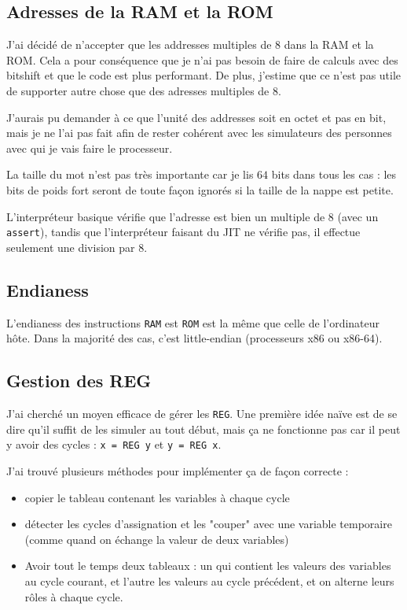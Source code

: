 \documentclass[12pt]{article}
\begin{document}
\subsection{Adresses de la RAM et la ROM}

J'ai décidé de n'accepter que les addresses multiples de $8$ dans la RAM et la ROM. Cela a pour conséquence que je n'ai pas besoin de faire de calculs avec des bitshift et que le code est plus performant. De plus, j'estime que ce n'est pas utile de supporter autre chose que des adresses multiples de $8$.

J'aurais pu demander à ce que l'unité des addresses soit en octet et pas en bit, mais je ne l'ai pas fait afin de rester cohérent avec les simulateurs des personnes avec qui je vais faire le processeur.

La taille du mot n'est pas très importante car je lis $64$ bits dans tous les cas : les bits de poids fort seront de toute façon ignorés si la taille de la nappe est petite.

L'interpréteur basique vérifie que l'adresse est bien un multiple de $8$ (avec un \verb$assert$), tandis que l'interpréteur faisant du JIT ne vérifie pas, il effectue seulement une division par $8$.

\subsection{Endianess}

L'endianess des instructions \verb$RAM$ est \verb$ROM$ est la même que celle de l'ordinateur hôte. Dans la majorité des cas, c'est little-endian (processeurs x86 ou x86-64).

\subsection{Gestion des REG}

J'ai cherché un moyen efficace de gérer les \verb$REG$.
Une première idée naïve est de se dire qu'il suffit de les simuler au tout début, mais ça ne fonctionne pas car il peut y avoir des cycles : \verb$x = REG y$ et \verb$y = REG x$.

J'ai trouvé plusieurs méthodes pour implémenter ça de façon correcte :

\begin{itemize}
    \item copier le tableau contenant les variables à chaque cycle
    \item détecter les cycles d'assignation et les "couper" avec une variable temporaire (comme quand on échange la valeur de deux variables)
    \item Avoir tout le temps deux tableaux : un qui contient les valeurs des variables au cycle courant, et l'autre les valeurs au cycle précédent, et on alterne leurs rôles à chaque cycle.
\end{itemize}
\end{document}

